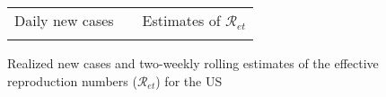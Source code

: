 \documentclass[12pt]{article}
\begin{document}
\begin{figure}[tbh]%
\caption
{Realized new cases and two-weekly rolling estimates of the effective reproduction numbers ($\mathcal
{R}_{et}$)  for the US}%
\vspace{-0.2cm}%
\label{fig: US_Re}%

\begin{footnotesize}%


\begin{center}%
\begin{tabular}
[c]{ccc}%
Daily new cases &  & Estimates of $\mathcal{R}_{et}$\\%
{\includegraphics[
height=1.7763in,
width=3.5293in
]%
{figs/US_dcT.png}%
}
&  &
{\includegraphics[
height=1.9951in,
width=2.6524in
]%
{figs/US_ER_N50000_guess5_2W_Re.png}%
}
\end{tabular}



\end{center}


\end{footnotesize}
\end{figure}
\end{document}
